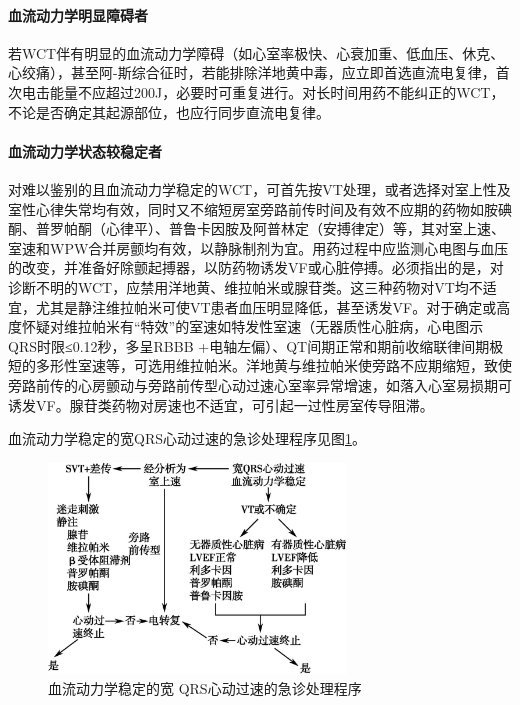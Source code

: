\paragraph{血流动力学明显障碍者}

若WCT伴有明显的血流动力学障碍（如心室率极快、心衰加重、低血压、休克、心绞痛），甚至阿-斯综合征时，若能排除洋地黄中毒，应立即首选直流电复律，首次电击能量不应超过200J，必要时可重复进行。对长时间用药不能纠正的WCT，不论是否确定其起源部位，也应行同步直流电复律。

\paragraph{血流动力学状态较稳定者}

对难以鉴别的且血流动力学稳定的WCT，可首先按VT处理，或者选择对室上性及室性心律失常均有效，同时又不缩短房室旁路前传时间及有效不应期的药物如胺碘酮、普罗帕酮（心律平）、普鲁卡因胺及阿普林定（安搏律定）等，其对室上速、室速和WPW合并房颤均有效，以静脉制剂为宜。用药过程中应监测心电图与血压的改变，并准备好除颤起搏器，以防药物诱发VF或心脏停搏。必须指出的是，对诊断不明的WCT，应禁用洋地黄、维拉帕米或腺苷类。这三种药物对VT均不适宜，尤其是静注维拉帕米可使VT患者血压明显降低，甚至诱发VF。对于确定或高度怀疑对维拉帕米有“特效”的室速如特发性室速（无器质性心脏病，心电图示QRS时限≤0.12秒，多呈RBBB
+电轴左偏）、QT间期正常和期前收缩联律间期极短的多形性室速等，可选用维拉帕米。洋地黄与维拉帕米使旁路不应期缩短，致使旁路前传的心房颤动与旁路前传型心动过速心室率异常增速，如落入心室易损期可诱发VF。腺苷类药物对房速也不适宜，可引起一过性房室传导阻滞。

血流动力学稳定的宽QRS心动过速的急诊处理程序见图\ref{fig102-18}。

\begin{figure}[!htbp]
 \centering
 \includegraphics[width=3.10417in,height=2.20833in]{./images/Image00457.jpg}
 \captionsetup{justification=centering}
 \caption{血流动力学稳定的宽 QRS心动过速的急诊处理程序}
 \label{fig102-18}
  \end{figure} 

